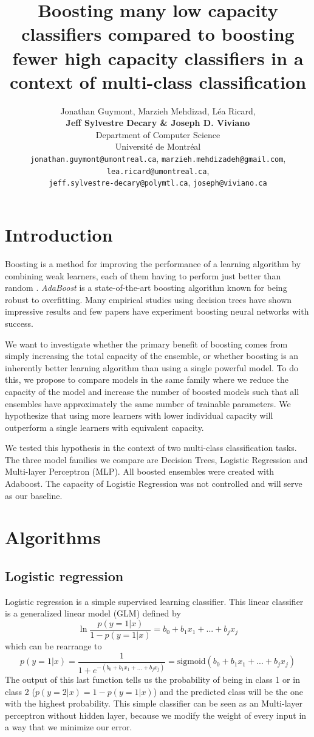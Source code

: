 \documentclass{article}
\title{Boosting many low capacity classifiers compared to boosting fewer high capacity classifiers in a context of multi-class classification}
\author{%
 Jonathan Guymont, Marzieh Mehdizad, L\'ea Ricard,\\ \textbf{Jeff Sylvestre Decary \& Joseph D. Viviano}\\
  Department of Computer Science\\
  Universit\'e de Montr\'eal\\
  \texttt{jonathan.guymont@umontreal.ca}, \texttt{marzieh.mehdizadeh@gmail.com}, \texttt{lea.ricard@umontreal.ca},\\
  \texttt{jeff.sylvestre-decary@polymtl.ca}, \texttt{joseph@viviano.ca} \\
}
\newcommand{\sigmoid}{\mathrm{sigmoid}}
\begin{document}

\maketitle
\section{Introduction}
Boosting is a method for improving the performance of a learning algorithm by combining weak learners, each of them having to perform just better than random \cite{Schwenk}. \textit{AdaBoost}\cite{Freund} is a state-of-the-art boosting algorithm known for being robust to overfitting. Many empirical studies using decision trees have shown impressive results \cite{Schwenk} and few papers have experiment boosting neural networks with success.

We want to investigate whether the primary benefit of boosting comes from simply increasing the total capacity of the ensemble, or whether boosting is an inherently better learning algorithm than using a single powerful model. To do this, we propose to compare models in the same family where we reduce the capacity of the model and increase the number of boosted models such that all ensembles have approximately the same number of trainable parameters. We hypothesize that using more learners with lower individual capacity will outperform a single learners with equivalent capacity.

We tested this hypothesis in the context of two multi-class classification tasks. The three model families we compare are Decision Trees, Logistic Regression and Multi-layer Perceptron (MLP). All boosted ensembles were created with Adaboost. The capacity of Logistic Regression was not controlled and will serve as our baseline.  

\section{Algorithms}

\subsection{Logistic regression}
Logistic regression is a simple supervised learning classifier. This linear classifier is a generalized linear model (GLM) defined by 
\begin{equation}
    \ln \frac{p(y=1|x)}{1-p(y=1|x)}= b_0+b_1x_1+...+b_j x_j
\end{equation}
which can be rearrange to 
\begin{equation}
    p(y=1|x)=\frac{1}{1+e^{-(b_0+b_1x_1+...+b_j x_j)}}=\sigmoid(b_0+b_1x_1+...+b_j x_j)
\end{equation}
The output of this last function tells us the probability of being in class 1 or in class 2 ($p(y=2|x)=1-p(y=1|x)$) and the predicted class will be the one with the highest probability. This simple classifier can be seen as an Multi-layer perceptron without hidden layer, because we modify the weight of every input in a way that we minimize our error. 
\end{document}
